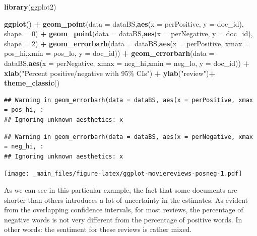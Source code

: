 \documentclass[
]{book}
\newenvironment{Shaded}{\begin{snugshade}}{\end{snugshade}}
\newcommand{\AttributeTok}[1]{\textcolor[rgb]{0.13,0.29,0.53}{#1}}
\newcommand{\DecValTok}[1]{\textcolor[rgb]{0.00,0.00,0.81}{#1}}
\newcommand{\FunctionTok}[1]{\textcolor[rgb]{0.13,0.29,0.53}{\textbf{#1}}}
\newcommand{\NormalTok}[1]{#1}
\newcommand{\SpecialCharTok}[1]{\textcolor[rgb]{0.81,0.36,0.00}{\textbf{#1}}}
\newcommand{\StringTok}[1]{\textcolor[rgb]{0.31,0.60,0.02}{#1}}
\begin{document}
\begin{Shaded}
\begin{Highlighting}[]
\FunctionTok{library}\NormalTok{(ggplot2)}

\FunctionTok{ggplot}\NormalTok{() }\SpecialCharTok{+}
 \FunctionTok{geom\_point}\NormalTok{(}\AttributeTok{data =}\NormalTok{ dataBS,}\FunctionTok{aes}\NormalTok{(}\AttributeTok{x =}\NormalTok{ perPositive, }\AttributeTok{y =}\NormalTok{ doc\_id), }\AttributeTok{shape =} \DecValTok{0}\NormalTok{) }\SpecialCharTok{+}
 \FunctionTok{geom\_point}\NormalTok{(}\AttributeTok{data =}\NormalTok{ dataBS,}\FunctionTok{aes}\NormalTok{(}\AttributeTok{x =}\NormalTok{ perNegative, }\AttributeTok{y =}\NormalTok{ doc\_id), }\AttributeTok{shape =} \DecValTok{2}\NormalTok{) }\SpecialCharTok{+}
 \FunctionTok{geom\_errorbarh}\NormalTok{(}\AttributeTok{data =}\NormalTok{ dataBS,}\FunctionTok{aes}\NormalTok{(}\AttributeTok{x =}\NormalTok{ perPositive, }\AttributeTok{xmax =}\NormalTok{ pos\_hi,}\AttributeTok{xmin =}\NormalTok{ pos\_lo, }\AttributeTok{y =}\NormalTok{ doc\_id)) }\SpecialCharTok{+}
 \FunctionTok{geom\_errorbarh}\NormalTok{(}\AttributeTok{data =}\NormalTok{ dataBS,}\FunctionTok{aes}\NormalTok{(}\AttributeTok{x =}\NormalTok{ perNegative, }\AttributeTok{xmax =}\NormalTok{ neg\_hi,}\AttributeTok{xmin =}\NormalTok{ neg\_lo, }\AttributeTok{y =}\NormalTok{ doc\_id)) }\SpecialCharTok{+}
 \FunctionTok{xlab}\NormalTok{(}\StringTok{"Percent positive/negative with 95\% CIs"}\NormalTok{) }\SpecialCharTok{+}
 \FunctionTok{ylab}\NormalTok{(}\StringTok{"review"}\NormalTok{)}\SpecialCharTok{+}
 \FunctionTok{theme\_classic}\NormalTok{()}
\end{Highlighting}
\end{Shaded}

\begin{verbatim}
## Warning in geom_errorbarh(data = dataBS, aes(x = perPositive, xmax = pos_hi, :
## Ignoring unknown aesthetics: x
\end{verbatim}

\begin{verbatim}
## Warning in geom_errorbarh(data = dataBS, aes(x = perNegative, xmax = neg_hi, :
## Ignoring unknown aesthetics: x
\end{verbatim}

\texttt{[image: \_main\_files/figure-latex/ggplot-moviereviews-posneg-1.pdf]}

As we can see in this particular example, the fact that some documents are shorter than others introduces a lot of uncertainty in the estimates. As evident from the overlapping confidence intervals, for most reviews, the percentage of negative words is not very different from the percentage of positive words. In other words: the sentiment for these reviews is rather mixed.
\end{document}
